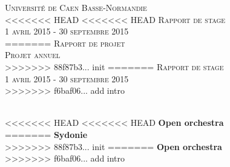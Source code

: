\begin{titlepage}


\center %


\textsc{\LARGE Université de Caen Basse-Normandie}\\[1.5cm] %
<<<<<<< HEAD
<<<<<<< HEAD
\textsc{\Large Rapport de stage}\\[0.5cm] %
\textsc{1 avril 2015 - 30 septembre 2015}\\[0.5cm] %
=======
\textsc{\Large Rapport de projet}\\[0.5cm] %
\textsc{\large Projet annuel}\\[0.5cm] %
>>>>>>> 88f87b3... init
=======
\textsc{\Large Rapport de stage}\\[0.5cm] %
\textsc{1 avril 2015 - 30 septembre 2015}\\[0.5cm] %
>>>>>>> f6baf06... add intro


\HRule \\[0.4cm]
<<<<<<< HEAD
<<<<<<< HEAD
{ \huge \bfseries Open orchestra}\\[0.4cm] %
=======
{ \huge \bfseries Sydonie}\\[0.4cm] %
>>>>>>> 88f87b3... init
=======
{ \huge \bfseries Open orchestra}\\[0.4cm] %
>>>>>>> f6baf06... add intro
\HRule \\[1.5cm]


\end{titlepage}
